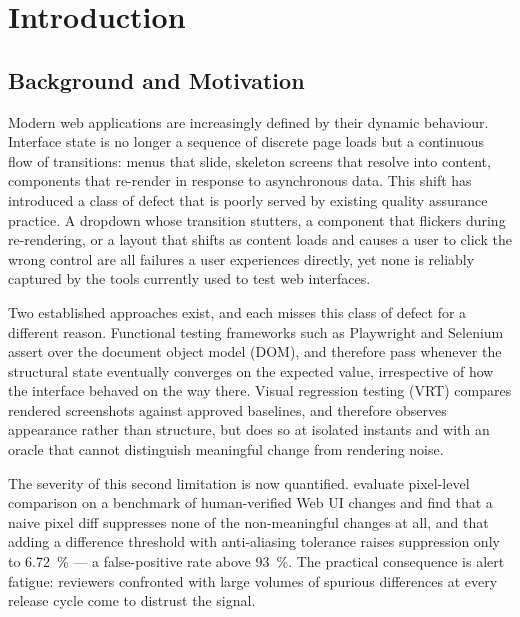 %
%

\chapter{Introduction}
\label{chap:introduction}


\section{Background and Motivation}
\label{sec:motivation}

Modern web applications are increasingly defined by their dynamic
behaviour. Interface state is no longer a sequence of discrete page loads
but a continuous flow of transitions: menus that slide, skeleton screens
that resolve into content, components that re-render in response to
asynchronous data. This shift has introduced a class of defect that is
poorly served by existing quality assurance practice. A dropdown whose
transition stutters, a component that flickers during re-rendering, or a
layout that shifts as content loads and causes a user to click the wrong
control are all failures a user experiences directly, yet none is reliably
captured by the tools currently used to test web interfaces.

Two established approaches exist, and each misses this class of defect for
a different reason. Functional testing frameworks such as Playwright and
Selenium assert over the document object model (DOM), and therefore pass
whenever the structural state eventually converges on the expected value,
irrespective of how the interface behaved on the way there. Visual
regression testing (VRT) compares rendered screenshots against approved
baselines, and therefore observes appearance rather than structure, but
does so at isolated instants and with an oracle that cannot distinguish
meaningful change from rendering noise.

The severity of this second limitation is now quantified.
\citet{zhang2026beyond} evaluate pixel-level comparison on a benchmark of
human-verified Web UI changes and find that a naive pixel diff suppresses
none of the non-meaningful changes at all, and that adding a difference
threshold with anti-aliasing tolerance raises suppression only to
\SI{6.72}{\percent} --- a false-positive rate above \SI{93}{\percent}.
The practical consequence is alert fatigue: reviewers confronted with
large volumes of spurious differences at every release cycle come to
distrust the signal.


